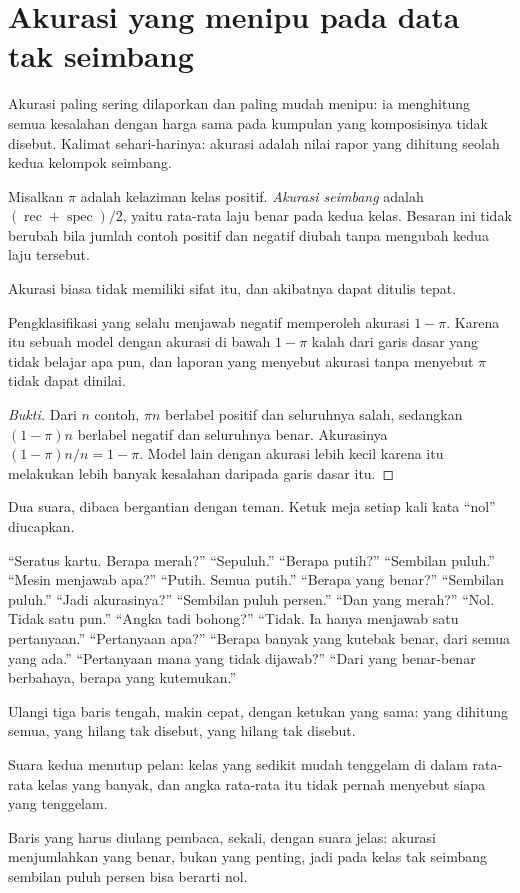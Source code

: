 \section{Akurasi yang menipu pada data tak seimbang}

Akurasi paling sering dilaporkan dan paling mudah menipu: ia menghitung semua
kesalahan dengan harga sama pada kumpulan yang komposisinya tidak disebut. Kalimat
sehari-harinya: akurasi adalah nilai rapor yang dihitung seolah kedua kelompok
seimbang.

\begin{definisi}
Misalkan $\pi$ adalah kelaziman kelas positif. \emph{Akurasi seimbang} adalah
$(\operatorname{rec}+\operatorname{spec})/2$, yaitu rata-rata laju benar pada kedua kelas.
Besaran ini tidak berubah bila jumlah contoh positif dan negatif diubah tanpa mengubah
kedua laju tersebut.
\end{definisi}

Akurasi biasa tidak memiliki sifat itu, dan akibatnya dapat ditulis tepat.

\begin{proposisi}
Pengklasifikasi yang selalu menjawab negatif memperoleh akurasi $1-\pi$. Karena itu
sebuah model dengan akurasi di bawah $1-\pi$ kalah dari garis dasar yang tidak belajar
apa pun, dan laporan yang menyebut akurasi tanpa menyebut $\pi$ tidak dapat dinilai.
\end{proposisi}

\begin{proof}[Bukti]
Dari $n$ contoh, $\pi n$ berlabel positif dan seluruhnya salah, sedangkan $(1-\pi)n$
berlabel negatif dan seluruhnya benar. Akurasinya $(1-\pi)n/n=1-\pi$. Model lain dengan
akurasi lebih kecil karena itu melakukan lebih banyak kesalahan daripada garis dasar itu.
\end{proof}

\begin{bacakeras}
Dua suara, dibaca bergantian dengan teman. Ketuk meja setiap kali kata ``nol'' diucapkan.

``Seratus kartu. Berapa merah?'' ``Sepuluh.'' ``Berapa putih?'' ``Sembilan puluh.''
``Mesin menjawab apa?'' ``Putih. Semua putih.'' ``Berapa yang benar?'' ``Sembilan puluh.''
``Jadi akurasinya?'' ``Sembilan puluh persen.'' ``Dan yang merah?'' ``Nol. Tidak satu pun.''
``Angka tadi bohong?'' ``Tidak. Ia hanya menjawab satu pertanyaan.''
``Pertanyaan apa?'' ``Berapa banyak yang kutebak benar, dari semua yang ada.''
``Pertanyaan mana yang tidak dijawab?'' ``Dari yang benar-benar berbahaya, berapa yang kutemukan.''

Ulangi tiga baris tengah, makin cepat, dengan ketukan yang sama: yang dihitung semua, yang
hilang tak disebut, yang hilang tak disebut.

Suara kedua menutup pelan: kelas yang sedikit mudah tenggelam di dalam rata-rata kelas
yang banyak, dan angka rata-rata itu tidak pernah menyebut siapa yang tenggelam.

Baris yang harus diulang pembaca, sekali, dengan suara jelas: akurasi menjumlahkan yang
benar, bukan yang penting, jadi pada kelas tak seimbang sembilan puluh persen bisa berarti
nol.
\end{bacakeras}

